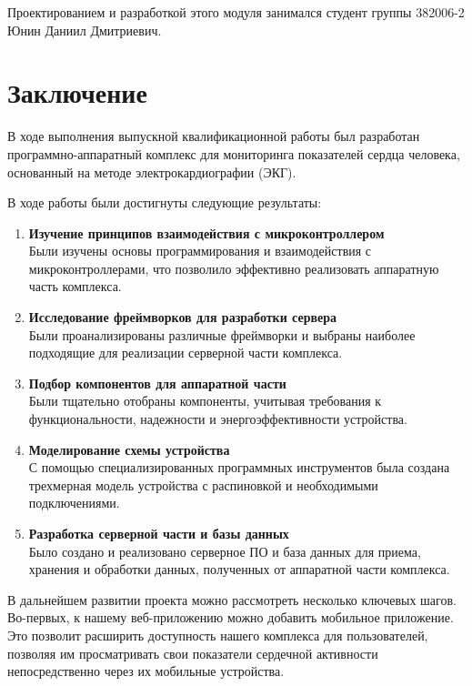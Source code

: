 \documentclass[12pt, russian]{extarticle}
\begin{document}
\begin{spacing}{1.5}
Проектированием и разработкой этого модуля занимался студент группы 382006-2 Юнин Даниил Дмитриевич.

\newpage
\section{Заключение}

В ходе выполнения выпускной квалификационной работы был разработан программно-аппаратный комплекс для мониторинга показателей сердца человека, основанный на методе электрокардиографии (ЭКГ).

\noindent В ходе работы были достигнуты следующие результаты:

\begin{enumerate}
    \item \textbf{Изучение принципов взаимодействия с микроконтроллером} \\
        Были изучены основы программирования и взаимодействия с микроконтроллерами, что позволило эффективно реализовать аппаратную часть комплекса.
    \item \textbf{Исследование фреймворков для разработки сервера} \\
        Были проанализированы различные фреймворки и выбраны наиболее подходящие для реализации серверной части комплекса.
    \item \textbf{Подбор компонентов для аппаратной части} \\
        Были тщательно отобраны компоненты, учитывая требования к функциональности, надежности и энергоэффективности устройства.
    \item \textbf{Моделирование схемы устройства} \\
        С помощью специализированных программных инструментов была создана трехмерная модель устройства с распиновкой и необходимыми подключениями.
    \item \textbf{Разработка серверной части и базы данных} \\
        Было создано и реализовано серверное ПО и база данных для приема, хранения и обработки данных, полученных от аппаратной части комплекса.
\end{enumerate}

В дальнейшем развитии проекта можно рассмотреть несколько ключевых шагов. Во-первых, к нашему веб-приложению можно добавить мобильное приложение. Это позволит расширить доступность нашего комплекса для пользователей, позволяя им просматривать свои показатели сердечной активности непосредственно через их мобильные устройства.


\end{spacing}
\end{document}

